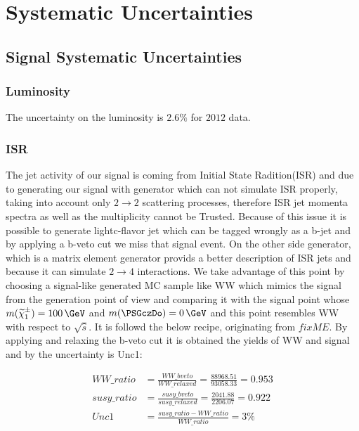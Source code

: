\section{Systematic Uncertainties}
\label{sect:sys}
\subsection{Signal Systematic Uncertainties}
\subsubsection{Luminosity}
The uncertainty on the luminosity  is $2.6\%$ for $2012$ data.

\subsubsection{ISR}
The jet activity of our signal is coming from Initial State Radition(ISR) and due to generating our signal with \PYTHIA generator which can not simulate ISR properly, taking into account only $2 \rightarrow 2$ scattering processes, therefore ISR jet momenta spectra as well as the multiplicity cannot be Trusted. Because of this issue it is possible to generate lightc-flavor jet which can be tagged wrongly as a b-jet and by applying a b-veto cut we miss that signal event. On the other side \MADGRAPH generator, which is a matrix element generator provids a better description of ISR jets and because it can simulate $2 \rightarrow 4$ interactions. 
We take advantage of this point by choosing a signal-like \MADGRAPH generated MC sample like WW which mimics the signal from the generation point of view and comparing it with the signal point whose $m(\chione) = 100\,\GeV$ and $m(\PSGczDo) = 0\,\GeV$ and this point resembles WW with respect to $\sqrt {\hat{s}}$. It is followd the below recipe, originating from $fixME$.
By applying and relaxing the b-veto cut it is obtained the yields of WW and signal and by the uncertainty is Unc1:


\begin{align}
WW\_ratio &= \frac{WW\_bveto}{WW\_relaxed} = \frac{88968.51}{93058.33} = 0.953\\ \nonumber
susy\_ratio &= \frac{susy\_bveto}{susy\_relaxed} = \frac{2041.88}{2206.07} = 0.922 \\ \nonumber
Unc1 &= \frac{susy\_ratio - WW\_ratio}{WW\_ratio} = 3 \% 
\end{align}


